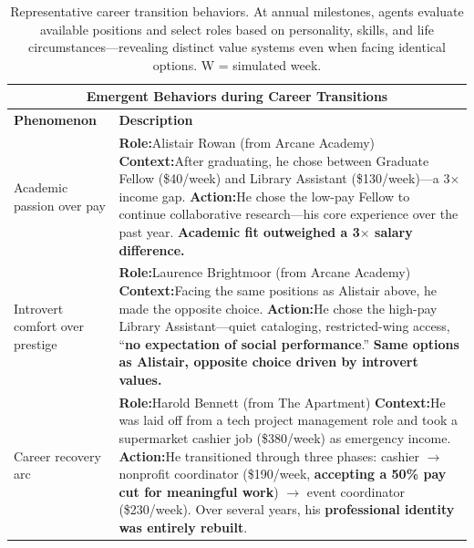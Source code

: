 \begin{table}[t]
\centering
\small
\caption{Representative career transition behaviors. At annual milestones, agents evaluate available positions and select roles based on personality, skills, and life circumstances---revealing distinct value systems even when facing identical options. W = simulated week.}
\label{tab:career}
\begin{tabular}{p{0.8in}p{4.3in}}
\toprule
\multicolumn{2}{c}{\textbf{Emergent Behaviors during Career Transitions}} \\
\midrule
\textbf{Phenomenon} & \textbf{Description} \\
\midrule

Academic \newline passion over \newline pay
&
\textbf{Role:}\quad Alistair Rowan \hfill (from Arcane Academy) \newline
\textbf{Context:}\quad After graduating, he chose between Graduate Fellow (\$40/week) and Library Assistant (\$130/week)---a 3$\times$ income gap. \newline
\textbf{Action:}\quad He chose the low-pay Fellow to continue collaborative research---his core experience over the past year. \textbf{Academic fit outweighed a 3$\times$ salary difference.}
\\
\midrule

Introvert \newline comfort over \newline prestige
&
\textbf{Role:}\quad Laurence Brightmoor \hfill (from Arcane Academy) \newline
\textbf{Context:}\quad Facing the same positions as Alistair above, he made the opposite choice. \newline
\textbf{Action:}\quad He chose the high-pay Library Assistant---quiet cataloging, restricted-wing access, ``\textbf{no expectation of social performance}.'' \textbf{Same options as Alistair, opposite choice driven by introvert values.}
\\
\midrule

Career \newline recovery arc
&
\textbf{Role:}\quad Harold Bennett \hfill (from The Apartment) \newline
\textbf{Context:}\quad He was laid off from a tech project management role and took a supermarket cashier job (\$380/week) as emergency income. \newline
\textbf{Action:}\quad He transitioned through three phases: cashier $\to$ nonprofit coordinator (\$190/week, \textbf{accepting a 50\% pay cut for meaningful work}) $\to$ event coordinator (\$230/week). Over several years, his \textbf{professional identity was entirely rebuilt}.
\\
\midrule


\end{tabular}
\end{table}
